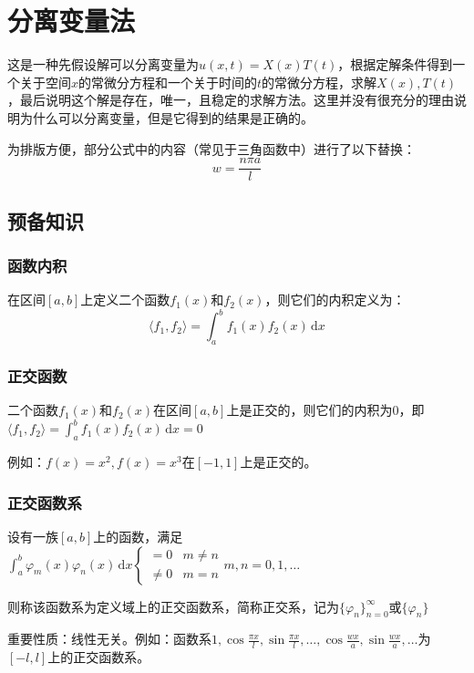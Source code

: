 \chapter{分离变量法}

这是一种先假设解可以分离变量为\(u(x,t)=X(x)T(t)\)，根据定解条件得到一个关于空间\(x\)的常微分方程和一个关于时间的\(t\)的常微分方程，求解\(X(x),T(t)\)，最后说明这个解是存在，唯一，且稳定的求解方法。这里并没有很充分的理由说明为什么可以分离变量，但是它得到的结果是正确的。

为排版方便，部分公式中的内容（常见于三角函数中）进行了以下替换：\[w=\frac{n\pi a}{l}\]%

\section{预备知识}

\subsection{函数内积}

在区间\([a,b]\)上定义二个函数\(f_1(x)\)和\(f_2(x)\)，则它们的内积定义为：
\[
\langle f_1,f_2\rangle=\int_{a}^{b}{f_1(x)f_2(x)\,\mathrm{d}x}
\]

\subsection{正交函数}

二个函数\(f_1(x)\)和\(f_2(x)\)在区间\([a,b]\)上是正交的，则它们的内积为0，即\(\langle f_1,f_2\rangle=\int_{a}^{b}{f_1(x)f_2(x)\,\mathrm{d}x}=0\)

例如：\(f(x)=x^2,f(x)=x^3\)在\([-1,1]\)上是正交的。

\subsection{正交函数系}

设有一族\([a,b]\)上的函数，满足\(\int_{a}^{b}{\varphi_m(x)\varphi_n(x)\,\mathrm{d}x}\begin{cases}=0&m\neq n\\\neq0&m=n\end{cases}m,n=0,1,\ldots\)

则称该函数系为定义域上的正交函数系，简称正交系，记为\(\{\varphi_n\}_{n=0}^\infty\)或\(\{\varphi_n\}\)

重要性质：线性无关。例如：函数系\(1,\cos{\frac{\pi x}{l}},\sin{\frac{\pi x}{l}},\ldots,\cos{\frac{wx}{a}},\sin{\frac{wx}{a}},\ldots\)为\([-l,l]\)上的正交函数系。


